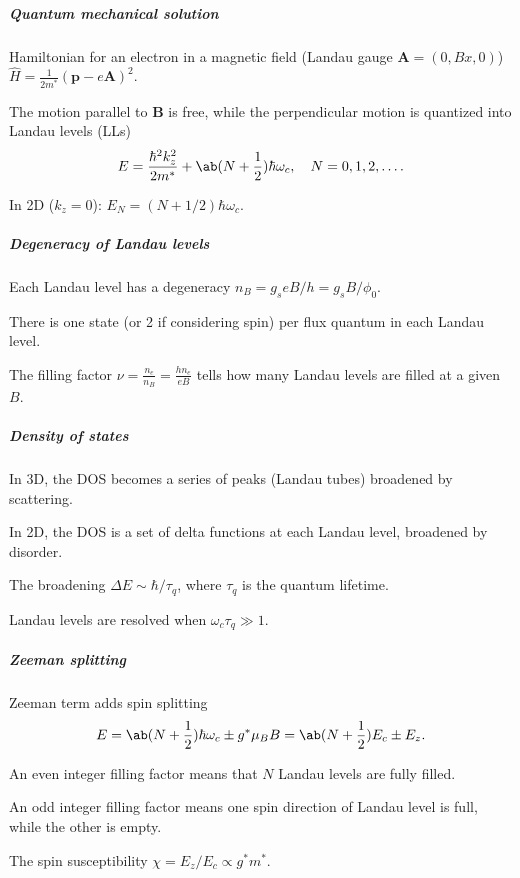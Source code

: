 \subparagraph{Quantum mechanical solution}

\begin{enumext}
  \item Hamiltonian for an electron in a magnetic field (Landau
  gauge $\bm A = (0, Bx, 0)$) $\hat H = \frac{1}{2m^*} (\bm p - e\bm A)^2$.
  \item The motion parallel to $\bm B$ is free, while the perpendicular motion
  is quantized into Landau levels (LLs)
  \[
    E = \frac{\hbar^2 k_z^2}{2m^*} + \ab(N + \frac12) \hbar \omega_c, \quad
    N = 0,1,2,\dots.
  \]
  \item In 2D ($k_z = 0$): $E_N = (N + 1/2) \hbar \omega_c$.
\end{enumext}

\subparagraph{Degeneracy of Landau levels}

\begin{enumext}
  \item Each Landau level has a degeneracy $n_B = g_s eB/h = g_sB/\phi_0$.
  \item There is one state (or 2 if considering spin) per flux quantum in each
  Landau level.
  \item The filling factor $\nu = \frac{n_e}{n_B} = \frac{hn_e}{eB}$
  tells how many Landau levels are filled at a given $B$.
\end{enumext}

\subparagraph{Density of states}

\begin{enumext}
  \item In 3D, the DOS becomes a series of peaks (Landau tubes) broadened by
  scattering.
  \item In 2D, the DOS is a set of delta functions at each Landau level,
  broadened by disorder.
  \item The broadening $\Delta E \sim \hbar / \tau_q$, where $\tau_q$ is the
  quantum lifetime.
  \item Landau levels are resolved when $\omega_c \tau_q \gg 1$.
\end{enumext}

\subparagraph{Zeeman splitting}

\begin{enumext}
  \item Zeeman term adds spin splitting
  \[
    E = \ab(N + \frac12) \hbar \omega_c \pm g^* \mu_B B
      = \ab(N + \frac12) E_c \pm E_z.
  \]
  \begin{enumext}
    \item An even integer filling factor means that $N$ Landau levels are fully
    filled.
    \item An odd integer filling factor means one spin direction of Landau
    level is full, while the other is empty.
  \end{enumext}
  \item The spin susceptibility $\chi = E_z/E_c \propto g^* m^*$.
\end{enumext}

